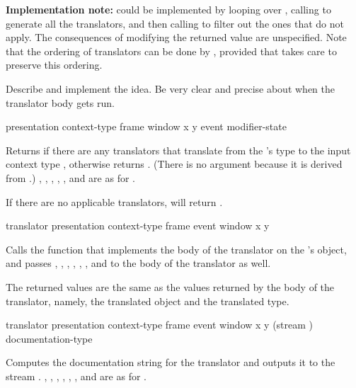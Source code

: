 {\bf Implementation note:}  could be implemented
by looping over , calling 
to generate all the translators, and then calling 
to filter out the ones that do not apply.  The consequences of modifying the
returned value are unspecified.  Note that the ordering of translators can be
done by , provided that
 takes care to preserve this ordering.

 {Describe and implement the  idea.
Be very clear and precise about when the translator body gets run.}

 {presentation context-type frame window x y
                                            \key event modifier-state}

Returns  if there are any translators that translate from the
 's type to the input context type
, otherwise returns .  (There is no
 argument because it is derived from .)
, , , , , and
 are as for .

If there are no applicable translators, 
will return .


 {translator presentation context-type
                                       frame event window x y}

Calls the function that implements the body of the translator 
on the  's object, and passes
, , , , ,
, and  to the body of the translator as well.

The returned values are the same as the values returned by the body of the
translator, namely, the translated object and the translated type.


 {translator presentation context-type
                                           frame event window x y
                                           \key (stream ) documentation-type}  

Computes the documentation string for the translator  and
outputs it to the stream .  , ,
, , , , and  are as for
.

